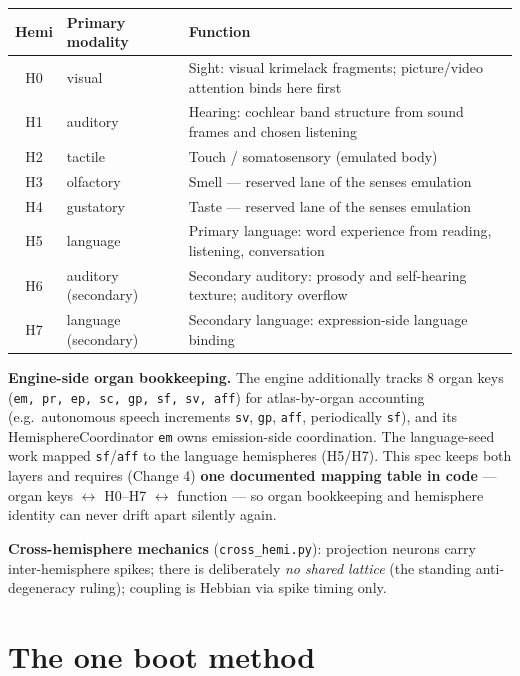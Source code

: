 \documentclass[11pt]{article}
\begin{document}
\begin{longtable}{c l p{}}
\toprule
\textbf{Hemi} & \textbf{Primary modality} & \textbf{Function} \\
\midrule
H0 & visual & Sight: visual krimelack fragments; picture/video attention
binds here first \\
H1 & auditory & Hearing: cochlear band structure from sound frames and
chosen listening \\
H2 & tactile & Touch / somatosensory (emulated body) \\
H3 & olfactory & Smell — reserved lane of the senses emulation \\
H4 & gustatory & Taste — reserved lane of the senses emulation \\
H5 & language & Primary language: word experience from reading, listening,
conversation \\
H6 & auditory (secondary) & Secondary auditory: prosody and self-hearing
texture; auditory overflow \\
H7 & language (secondary) & Secondary language: expression-side language
binding \\
\bottomrule
\end{longtable}

\textbf{Engine-side organ bookkeeping.} The engine additionally tracks 8
organ keys (\texttt{em, pr, ep, sc, gp, sf, sv, aff}) for atlas-by-organ
accounting (e.g.\ autonomous speech increments \texttt{sv}, \texttt{gp},
\texttt{aff}, periodically \texttt{sf}), and its HemisphereCoordinator
\texttt{em} owns emission-side coordination. The language-seed work mapped
\texttt{sf}/\texttt{aff} to the language hemispheres (H5/H7). This spec
keeps both layers and requires (Change 4) \textbf{one documented mapping
table in code} — organ keys $\leftrightarrow$ H0--H7 $\leftrightarrow$
function — so organ bookkeeping and hemisphere identity can never drift
apart silently again.

\textbf{Cross-hemisphere mechanics} (\texttt{cross\_hemi.py}): projection
neurons carry inter-hemisphere spikes; there is deliberately \emph{no shared
lattice} (the standing anti-degeneracy ruling); coupling is Hebbian via
spike timing only.

\section{The one boot method}\label{sec:boot}
\end{document}
